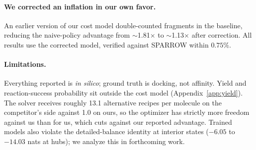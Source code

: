 \documentclass{article}
\newcommand{\checkval}[1]{#1}
\begin{document}
\paragraph{We corrected an inflation in our own favor.}
An earlier version of our cost model double-counted fragments in the baseline, reducing the naive-policy advantage from \checkval{$\sim$1.81$\times$} to
\checkval{$\sim$1.13$\times$} after correction. All results use the corrected model, verified against SPARROW within \checkval{$0.75\%$}.

\paragraph{Limitations.}
Everything reported is \emph{in silico}; ground truth is docking, not affinity. Yield and reaction-success probability sit outside the cost model
(Appendix~\ref{app:yield}). The solver receives roughly \checkval{13.1} alternative recipes per molecule on the competitor's side against \checkval{1.0} on ours, so the optimizer has strictly more freedom against us than for us, which cuts against our reported advantage. Trained models also violate the detailed-balance identity at interior states (\checkval{$-6.05$} to \checkval{$-14.03$} nats at hubs); we analyze this in forthcoming work.



\end{document}

